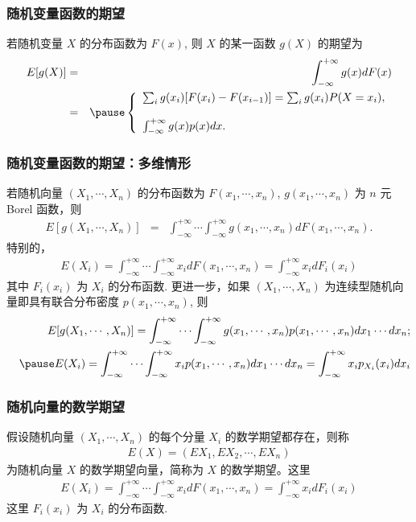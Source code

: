 	\begin{frame}
		\frametitle{随机变量函数的期望}
		\begin{thm}
			若随机变量 $X$ 的分布函数为 $F (x)$, 则 $X$ 的某一函数 $g (X)$ 的期望为
			\begin{eqnarray*}
				E[g(X)]&=&\int_{-\infty}^{+\infty}g(x)dF(x)\\
				&=&\pause \left\{
				\begin{array}{l}
					\sum_{i}g(x_i)[F(x_i)-F(x_{i-1})]=\sum_{i}g(x_i)P(X=x_i),\\
					\\
					\int_{-\infty}^{+\infty}g(x)p(x)dx.
				\end{array}
				\right.
			\end{eqnarray*}

		\end{thm}
	\end{frame}
	\begin{frame}
		\frametitle{随机变量函数的期望：多维情形}
		\begin{thm}
			若随机向量 $(X_1,\cdots, X_n)$ 的分布函数为 $F (x_1,\cdots,x_n)$, $g (x_1,\cdots, x_n)$ 为 $n$ 元 Borel 函数，则
			\begin{eqnarray*}
				E[g(X_1,\cdots, X_n)]&=&\int_{-\infty}^{+\infty}\cdots\int_{-\infty}^{+\infty}g(x_1,\cdots,x_n)dF(x_1,\cdots,x_n).
			\end{eqnarray*}
			特别的，\pause
			\begin{eqnarray*}
				E(X_i)=\int_{-\infty}^{+\infty}\cdots\int_{-\infty}^{+\infty}x_idF(x_1,\cdots,x_n)=\int_{-\infty}^{+\infty}x_idF_i(x_i)
			\end{eqnarray*}
			其中 $F_i (x_i)$ 为 $X_i$ 的分布函数. \pause 更进一步，如果 $(X_1,\cdots,X_n)$ 为连续型随机向量即具有联合分布密度 $p (x_1,\cdots,x_n)$, 则 \pause
			\begin{eqnarray*}
				&&E[g(X_1,\cdots, X_n)]=\int_{-\infty}^{+\infty}\cdots\int_{-\infty}^{+\infty}g(x_1,\cdots,x_n)p(x_1,\cdots,x_n)dx_1\cdots dx_n;\\
				&&\pause E(X_i)=\int_{-\infty}^{+\infty}\cdots\int_{-\infty}^{+\infty}x_ip(x_1,\cdots,x_n)dx_1\cdots dx_n=\int_{-\infty}^{+\infty}x_ip_{X_i}(x_i)dx_i
			\end{eqnarray*}
		\end{thm}
	\end{frame}
	\begin{frame}
		\frametitle{随机向量的数学期望}
		\begin{defi}
			假设随机向量 $(X_1,\cdots, X_n)$ 的每个分量 $X_i$ 的数学期望都存在，则称
			\begin{eqnarray*}
				E(X)=(EX_1,EX_2,\cdots,EX_n)
			\end{eqnarray*}
			为随机向量 $X$ 的数学期望向量，简称为 $X$ 的数学期望。这里
			\begin{eqnarray*}
				E(X_i)=\int_{-\infty}^{+\infty}\cdots\int_{-\infty}^{+\infty}x_idF(x_1,\cdots,x_n)=\int_{-\infty}^{+\infty}x_idF_i(x_i)
			\end{eqnarray*}
			这里 $F_i (x_i)$ 为 $X_i$ 的分布函数.

		\end{defi}

	\end{frame}
